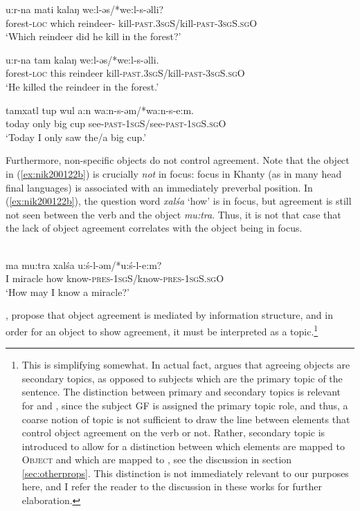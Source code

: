\documentclass[output=paper
,modfonts
,nonflat]{langsci/langscibook}
\begin{document}
\begin{exe}
\ex \citet[][143]{dn2011}
\begin{xlist}
\ex
{\gll u:r-na mati kalaŋ we:l-əs/*we:l-s-əlli?\\
forest-\textsc{loc} which reindeer- kill-\textsc{past.3sgS}/kill-\textsc{past-3sgS.sgO}\\
\glt `Which reindeer did he kill in the forest?'} \label{ex:focwh}

\ex
{\gll u:r-na tam kalaŋ we:l-əs/*we:l-s-əlli.\\
forest-\textsc{loc} this reindeer kill-\textsc{past.3sgS}/kill-\textsc{past-3sgS.sgO}\\
\glt `He killed the reindeer in the forest.'} \label{ex:focanswer}

\ex
{\gll tamxatl tup wul a:n wa:n-s-əm/*wa:n-s-e:m.\\
today only big cup see-\textsc{past-1sgS}/see-\textsc{past-1sgS.sgO}\\
\glt `Today I only saw the/a big cup.'} \label{ex:focpart}
\end{xlist} 
\end{exe}

\noindent Furthermore, non-specific objects do not control agreement.
Note that the object in (\ref{ex:nik200122b}) is crucially \emph{not} in focus: focus in Khanty (as in many head final languages) is associated with an immediately preverbal position. 
In (\ref{ex:nik200122b}), the question word \emph{xal\'{s}a} `how' is in focus, but agreement is still not seen between the verb and the object \emph{mu:tra}.
Thus, it is not that case that the lack of object agreement correlates with the object being in focus.

\begin{exe}
\ex \citet[][20]{nikolaeva2001}\\
{\gll ma mu:tra xal\'{s}a u:\'{s}-l-əm/*u:\'{s}-l-e:m?\\
I miracle how know-\textsc{pres-1sgS}/know-\textsc{pres-1sgS.sgO}\\
\glt `How may I know a miracle?'} \label{ex:nik200122b}
\end{exe}


\noindent \citet{nikolaeva2001}, \citet{dn2011} propose that object agreement is mediated by information structure, and in order for an object to show agreement, it must be interpreted as a topic.\footnote{This is simplifying somewhat.
In actual fact, \citet{nikolaeva2001} argues that agreeing objects are secondary topics, as opposed to subjects which are the primary topic of the sentence.
The distinction between primary and secondary topics is relevant for \cite{nikolaeva2001} and \cite{dn2011}, since the subject GF is assigned the primary topic role, and thus, a coarse notion of topic is not sufficient to draw the line between elements that control object agreement on the verb or not.
Rather, secondary topic is introduced to allow for a distinction between which elements are mapped to \textsc{Object} and which are mapped to \robj, see the discussion in section \ref{sec:otherprops}.
This distinction is not immediately relevant to our purposes here, and I refer the reader to the discussion in these works for further elaboration.}
\end{document}
